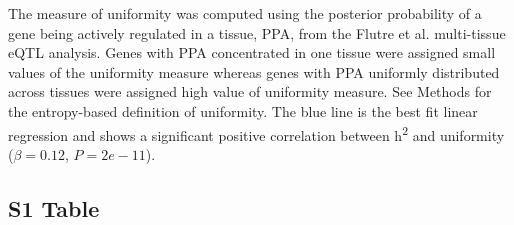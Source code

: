 \documentclass[10pt,letterpaper]{article}
\begin{document}
The measure of uniformity was computed using the posterior probability of a gene being actively regulated in a tissue, PPA, from the Flutre et al. \cite{Flutre_2013} multi-tissue eQTL analysis. Genes with PPA concentrated in one tissue were assigned small values of the uniformity measure whereas genes with PPA uniformly distributed across tissues were assigned high value of uniformity measure. See Methods for the entropy-based definition of uniformity. The blue line is the best fit linear regression and shows a significant positive correlation between h\textsuperscript{2} and uniformity ($\beta = 0.12$, $P = 2e-11$).
\pagebreak


\subsection*{S1 Table}
\label{S1_Table}
\end{document}
